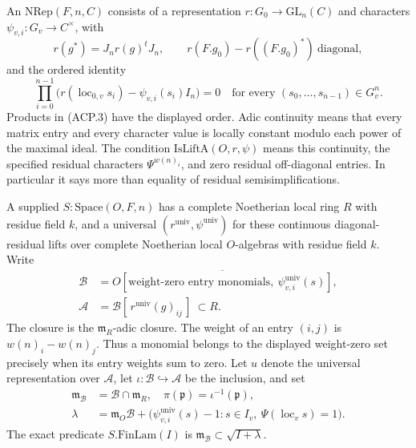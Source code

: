 An \(\mathrm{NRep}(F,n,C)\) consists of a representation
\(r:G_0\to\mathrm{GL}_n(C)\) and characters
\(\psi_{v,i}:G_v\to C^\times\), with
\[
 r(g^*)=J_nr(g)^tJ_n,
 \qquad r(F.g_0)-r((F.g_0)^*)\ \text{diagonal},
                                                        \tag{ACP.2}
\]
and the ordered identity
\[
 \prod_{i=0}^{n-1}
 \bigl(r(\operatorname{loc}_{0,v}s_i)
                         -\psi_{v,i}(s_i)I_n\bigr)=0
 \quad\text{for every }(s_0,\ldots,s_{n-1})\in G_v^n.
                                                        \tag{ACP.3}
\]
Products in (ACP.3) have the displayed order.
Adic continuity means that every matrix entry and every character
value is locally constant modulo each power of the maximal ideal.
The condition \(\mathrm{IsLiftA}(O,r,\psi)\) means this continuity,
the specified residual characters \(\Psi^{w(n)_i}\), and zero
residual off-diagonal entries.  In particular it says more than
equality of residual semisimplifications.

A supplied \(S:\mathrm{Space}(O,F,n)\) has a complete Noetherian
local ring \(R\) with residue field \(k\), and a universal
\((r^{\mathrm{univ}},\psi^{\mathrm{univ}})\) for these continuous
diagonal-residual lifts over complete Noetherian local
\(O\)-algebras with residue field \(k\).  Write
\[
 \begin{split}
 \mathcal B&=\overline{O[\text{weight-zero entry monomials},
                         \ \psi^{\mathrm{univ}}_{v,i}(s)]},\\
 \mathcal A&=\mathcal B[\,r^{\mathrm{univ}}(g)_{ij}\,]
                                          \ \subset R.
 \end{split}                                             \tag{ACP.4}
\]
The closure is the \(\mathfrak m_R\)-adic closure.  The weight of
an entry \((i,j)\) is \(w(n)_i-w(n)_j\).  Thus a monomial belongs
to the displayed weight-zero set precisely when its entry weights
sum to zero.  Let \(u\) denote the universal representation over
\(\mathcal A\), let \(\iota:\mathcal B\hookrightarrow\mathcal A\)
be the inclusion, and set
\[
 \begin{split}
 \mathfrak m_{\mathcal B}&=\mathcal B\cap\mathfrak m_R,
 \quad\pi(\mathfrak p)=\iota^{-1}(\mathfrak p),\\
 \lambda&=\mathfrak m_O\mathcal B+
  \bigl(\psi_{v,i}^{\mathrm{univ}}(s)-1:
       s\in I_v,\ \Psi(\operatorname{loc}_v s)=1\bigr).
 \end{split}                                             \tag{ACP.5}
\]
The exact predicate \(S.\mathrm{FinLam}(I)\) is
\(\mathfrak m_{\mathcal B}\subset\sqrt{I+\lambda}\).

